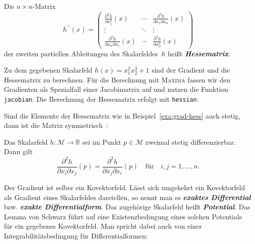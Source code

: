 Die $n\times n$-Matrix
\[
h^{\prime\prime}(x)=\left(\begin{array}{ccc}
\frac{\partial^{2}h}{\partial x_{1}^{2}}(x) & \cdots & \frac{\partial^{2}h}{\partial x_{1}\partial x_{n}}(x)\\
\vdots & \ddots & \vdots\\
\frac{\partial^{2}h}{\partial x_{n}\partial x_{1}}(x) & \cdots & \frac{\partial^{2}h}{\partial x_{n}^{2}}(x)
\end{array}\right)
\]
der zweiten partiellen Ableitungen des Skalarfeldes~$h$ heißt \textbf{\em Hessematrix}.
\begin{example}
\label{exa:grad-hess}Zu dem gegebenen Skalarfeld $h(x)=x_{1}^{2}x_{2}^{3}+1$
sind der Gradient und die Hessematrix zu berechnen. Für die Berechnung
mit \textsc{Maxima} fassen wir den Gradienten als Spezialfall einer
Jacobimatrix auf und nutzen die Funktion \texttt{jacobian}. Die Berechnung
der Hessematrix erfolgt mit \texttt{hessian}:


\end{example}
Sind die Elemente der Hessematrix wie in Beispiel~\ref{exa:grad-hess}
auch stetig, dann ist die Matrix symmetrisch~\cite{koenigsberger2-2004}:

\begin{lemma}
\label{lem:Schwarz}Das
Skalarfeld $h:\mathcal{M}\to{\mathbb{R}}$ sei im Punkt $p\in\mathcal{M}$ zweimal
stetig differenzierbar. Dann gilt
\begin{equation}
\frac{\partial^{2}h}{\partial x_{i}\partial x_{j}}(p)=\frac{\partial^{2}h}{\partial x_{j}\partial x_{i}}(p)\quad\textrm{für}\quad i,j=1,\ldots,n.\label{eq:lemma-schwarz}
\end{equation}
\end{lemma}
Der Gradient ist selber ein Kovektorfeld. Lässt sich umgekehrt ein
Kovektorfeld als Gradient eines Skalarfeldes darstellen, so nennt
man es \textbf{\em exaktes Differential} bzw.
\textbf{\em exakte Differentialform}. Das
zugehörige Skalarfeld heißt \textbf{\em Potential}. Das
Lemma von Schwarz führt auf eine Existenzbedingung eines solchen Potentials
für ein gegebenes Kovektorfeld. Man spricht dabei auch von einer Integrabilitätsbedingung
für Differentialformen:

